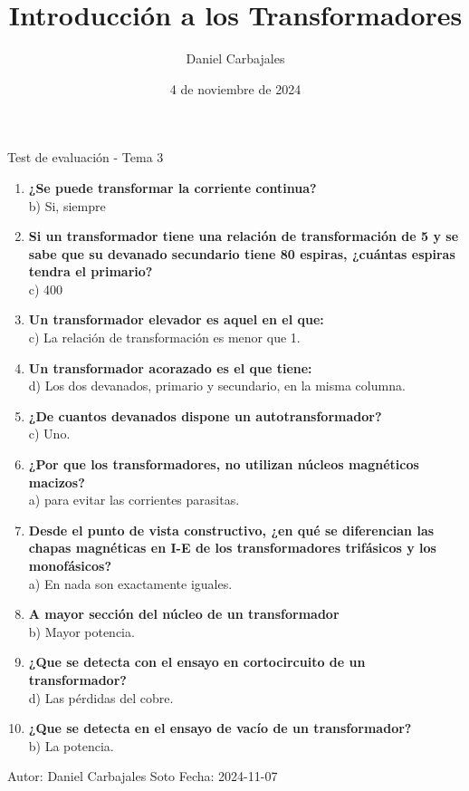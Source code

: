 \documentclass[spanish]{report}
\title{\Huge{Introducción a los Transformadores}}
\author{\large{Daniel Carbajales}}
\date{4 de noviembre de 2024}
\begin{document}

\begin{huge}
  \begin{center}
    Test de evaluación - Tema 3
  \end{center}
  \vspace{1em}
\end{huge}
  \begin{enumerate}
    \item{\textbf{¿Se puede transformar la corriente continua?}}\\
        b) Si, siempre
    \item{\textbf{Si un transformador tiene una relación de transformación de 5
      y se sabe que su devanado secundario tiene 80 espiras,
      ¿cuántas espiras tendra el primario?}}\\
        c) 400
    \item{\textbf{Un transformador elevador es aquel en el que:}}\\
        c) La relación de transformación es menor que 1.
    \item{\textbf{Un transformador acorazado es el que tiene:}}\\
        d) Los dos devanados, primario y secundario, en la misma columna.
    \item{\textbf{¿De cuantos devanados dispone un autotransformador?}}\\
        c) Uno.
    \item{\textbf{¿Por que los transformadores, no utilizan núcleos magnéticos macizos? }}\\
        a) para evitar las corrientes parasitas.
    \item{\textbf{Desde el punto de vista constructivo, ¿en qué se diferencian las chapas magnéticas en I-E de los transformadores trifásicos y los monofásicos?}}\\
        a) En nada son exactamente iguales.
    \item{\textbf{A mayor sección del núcleo de un transformador }}\\
        b) Mayor potencia.
    \item{\textbf{¿Que se detecta con el ensayo en cortocircuito de un transformador?}}\\
        d) Las pérdidas del cobre.
    \item{\textbf{¿Que se detecta en el ensayo de vacío de un transformador?}}\\
        b) La potencia.
  \end{enumerate}
\vspace*{\fill}
Autor: Daniel Carbajales Soto\hfill 
Fecha: 2024-11-07
\end{document}
